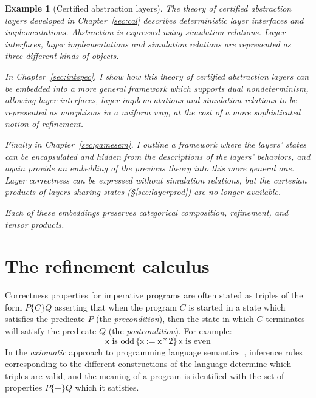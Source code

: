 \documentclass[11pt,oneside]{book}
\newtheorem{example}[theorem]{Example}
\theoremstyle{definition}
\newcommand{\kw}[1]{\ensuremath{ \mathsf{#1} }}
\newcommand{\htr}[3]{{ {#1} \lbrace {#2} \rbrace {#3} }}
\begin{document}
\begin{example}[Certified abstraction layers] %
The theory of certified abstraction layers
developed in Chapter~\ref{sec:cal}
describes deterministic layer interfaces
and implementations.
Abstraction is expressed using simulation relations.
Layer interfaces, layer implementations and simulation relations
are represented as three different kinds of objects.

In Chapter~\ref{sec:intspec},
I show how this theory of certified abstraction layers
can be embedded into a more general framework
which supports dual nondeterminism,
allowing layer interfaces, layer implementations and simulation relations
to be represented as morphisms in a uniform way,
at the cost of a more sophisticated notion of refinement.

Finally in Chapter~\ref{sec:gamesem},
I outline a framework where the layers' states
can be encapsulated and hidden from
the descriptions of the layers' behaviors,
and again provide an embedding of the previous theory
into this more general one.
Layer correctness can be expressed
without simulation relations,
but the cartesian products
of layers sharing states (\S\ref{sec:layerprod})
are no longer available.

Each of these embeddings preserves categorical composition,
refinement, and tensor products.
\end{example}



\section{The refinement calculus} \label{sec:refcal} %


Correctness properties for imperative programs
are often stated as triples of the form $\htr{P}{C}{Q}$
asserting that
when the program $C$ is started in a state which
satisfies the predicate $P$ (the \emph{precondition}),
then the state in which $C$ terminates
will satisfy the predicate $Q$ (the \emph{postcondition}).
For example:
\[
    \htr{\text{$\kw{x}$ is odd}\,}{\kw{x := x * 2}}{\,\text{$\kw{x}$ is even}}
\]
In the \emph{axiomatic} approach
to programming language semantics~\citep{hoare69},
inference rules
corresponding to the different constructions of the language
determine which triples are valid,
and the meaning of a program is identified with
the set of properties $\htr{P}{-}{Q}$
which it satisfies.
\end{document}

